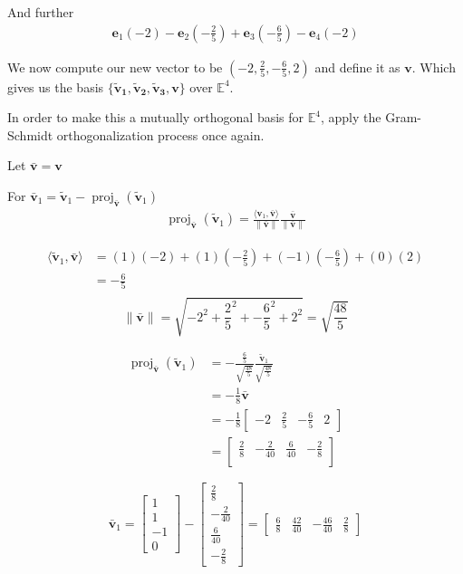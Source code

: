 \documentclass{tufte-book}
\DeclareMathOperator{\proj}{proj}
\newcommand{\vct}{\mathbf}
\newcommand{\dprod}[2]{\langle #1, #2 \rangle}
\theoremstyle{mytheoremstyle}
\theoremstyle{mylemstyle}
\theoremstyle{mydefstyle}
\begin{document}
And further
\begin{align*}
\vct{e}_1(-2) - \vct{e}_2(-\frac{2}{5}) + \vct{e}_3(-\frac{6}{5}) - \vct{e}_4(-2)
\end{align*}

We now compute our new vector to be $(-2, \frac{2}{5}, -\frac{6}{5}, 2)$ and define it as $\vct{v}$.  Which gives us the basis $\{\vct{\tilde{v}_1},\vct{\tilde{v}_2},\vct{\tilde{v}_3}, \vct{v}\}$ over $\mathbb{E}^4$.

In order to make this a mutually orthogonal basis for $\mathbb{E}^4$, apply the Gram-Schmidt orthogonalization process once again.

Let $ \vct{\bar{v}} = \vct{v}$

For $\vct{\bar{v}}_1 = \vct{\tilde{v}}_1 - \proj_{\vct{\bar{v}}}(\vct{\tilde{v}}_1)$
\begin{align*}
\proj_{\vct{\bar{v}}}(\vct{\tilde{v}}_1) = \frac{\dprod{\vct{v}_1}{\vct{\bar{v}}}}{\|\vct{\bar{v}}\|}\frac{\vct{\bar{v}}}{\|\vct{\bar{v}}\|}
\end{align*}

\begin{align*}
\dprod{\vct{\tilde{v}}_1}{\vct{\bar{v}}} &= (1)(-2) + (1)(-\frac{2}{5}) + (-1)(-\frac{6}{5}) +(0)(2)\\
&=-\frac{6}{5} \\
\end{align*}
\[
\|\vct{\bar{v}}\| = \sqrt{-2^2 + \frac{2}{5}^2 + -\frac{6}{5}^2 + 2^2}
= \sqrt{\frac{48}{5}}
\]


\begin{align*}
\proj_{\vct{\bar{v}}}(\vct{\tilde{v}}_1) &= -\frac{\frac{6}{5}}{\sqrt{\frac{48}{5}}}\frac{\vct{\tilde{v}}_1}{\sqrt{\frac{48}{5}}}\\
&= -\frac{1}{8}\vct{\bar{v}}\\
&= -\frac{1}{8}
\begin{bmatrix}
-2 & \frac{2}{5} & -\frac{6}{5} & 2
\end{bmatrix}\\
&= \begin{bmatrix}
\frac{2}{8} & -\frac{2}{40} & \frac{6}{40} & -\frac{2}{8} \\
\end{bmatrix}
\end{align*}

\[
\vct{\bar{v}}_1 = 
\begin{bmatrix}
1 \\
1 \\
-1 \\ 
0
\end{bmatrix} -
\begin{bmatrix}
\frac{2}{8} \\
-\frac{2}{40} \\ 
\frac{6}{40} \\
-\frac{2}{8}
\end{bmatrix}
=
\begin{bmatrix}
\frac{6}{8} & \frac{42}{40} &-\frac{46}{40} & \frac{2}{8}
\end{bmatrix}
\]
\end{document}
